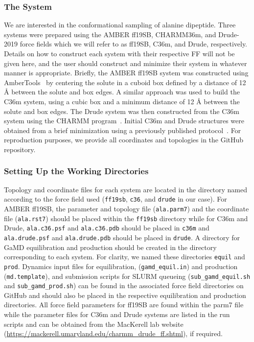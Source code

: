 \documentclass[9pt,tutorial,pubversion]{livecoms}
\begin{document}
\subsubsection{The System}
We are interested in the conformational sampling of alanine dipeptide. Three systems were prepared using the AMBER ff19SB, CHARMM36m, and Drude-2019 force fields which we will refer to as ff19SB, C36m, and Drude, respectively. Details on how to construct each system with their respective FF will not be given here, and the user should construct and minimize their system in whatever manner is appropriate. Briefly, the AMBER ff19SB system was constructed using AmberTools~\cite{case_ambertools_2023} by centering the solute in a cuboid box defined by a distance of 12 {\AA} between the solute and box edges. A similar approach was used to build the C36m system, using a cubic box and a minimum distance of 12 {\AA} between the solute and box edges. The Drude system was then constructed from the C36m system using the CHARMM program~\cite{hwang_charmm_2024}. Initial C36m and Drude structures were obtained from a brief minimization using a previously published protocol~\cite{lemkul_preparing_2021}. For reproduction purposes, we provide all coordinates and topologies in the GitHub repository.

\subsubsection{Setting Up the Working Directories} 
Topology and coordinate files for each system are located in the directory named according to the force field used (\texttt{ff19sb}, \texttt{c36}, and \texttt{drude} in our case). For AMBER ff19SB, the parameter and topology file (\texttt{ala.parm7}) and the coordinate file (\texttt{ala.rst7}) should be placed within the \texttt{ff19sb} directory while for C36m and Drude, \texttt{ala.c36.psf} and \texttt{ala.c36.pdb} should be placed in \texttt{c36m} and \texttt{ala.drude.psf} and \texttt{ala.drude.pdb} should be placed in \texttt{drude}. A directory for GaMD equilibration and production should be created in the directory corresponding to each system. For clarity, we named these directories \texttt{equil} and \texttt{prod}. Dynamics input files for equilibration, (\texttt{gamd\_equil.in}) and production (\texttt{md.template}), and submission scripts for SLURM queueing (\texttt{sub\_gamd\_equil.sh} and \texttt{sub\_gamd\_prod.sh}) can be found in the associated force field directories on GitHub and should also be placed in the respective equilibration and production directories. All force field parameters for ff19SB are found within the parm7 file while the parameter files for C36m and Drude systems are listed in the run scripts and can be obtained from the MacKerell lab website (\url{https://mackerell.umaryland.edu/charmm_drude_ff.shtml}), if required. 
\end{document}

